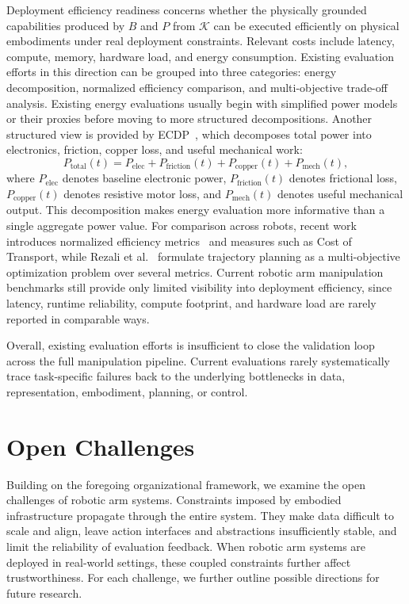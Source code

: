\documentclass[acmsmall,screen,review]{acmart}
\begin{document}
Deployment efficiency readiness concerns whether the physically grounded capabilities produced by \(B\) and \(P\) from \(\mathcal{K}\) can be executed efficiently on physical embodiments under real deployment constraints. Relevant costs include latency, compute, memory, hardware load, and energy consumption. Existing evaluation efforts in this direction can be grouped into three categories: energy decomposition, normalized efficiency comparison, and multi-objective trade-off analysis.
Existing energy evaluations usually begin with simplified power models or their proxies before moving to more structured decompositions.
Another structured view is provided by ECDP~\cite{heredia2023ecdp}, which decomposes total power into electronics, friction, copper loss, and useful mechanical work:
\begin{equation}
P_{\text{total}}(t) = P_{\text{elec}} + P_{\text{friction}}(t) + P_{\text{copper}}(t) + P_{\text{mech}}(t),
\end{equation}
where \(P_{\text{elec}}\) denotes baseline electronic power, \(P_{\text{friction}}(t)\) denotes frictional loss, \(P_{\text{copper}}(t)\) denotes resistive motor loss, and \(P_{\text{mech}}(t)\) denotes useful mechanical output.
This decomposition makes energy evaluation more informative than a single aggregate power value.
For comparison across robots, recent work introduces normalized efficiency metrics~\cite{vidussi2021energy,heredia2025evaluating} and measures such as Cost of Transport, 
while Rezali et al.~\cite{rezali2025lstm} formulate trajectory planning as a multi-objective optimization problem over several metrics. 
Current robotic arm manipulation benchmarks still provide only limited visibility into deployment efficiency, since latency, runtime reliability, compute footprint, and hardware load are rarely reported in comparable ways.

Overall, existing evaluation efforts is insufficient to close the validation loop across the full manipulation pipeline.
Current evaluations rarely systematically trace task-specific failures back to the underlying bottlenecks in data, representation, embodiment, planning, or control.

\section{Open Challenges}\label{sec:challenges}

Building on the foregoing organizational framework, we examine the open challenges of robotic arm systems.
Constraints imposed by embodied infrastructure propagate through the entire system.
They make data difficult to scale and align, leave action interfaces and abstractions insufficiently stable, and limit the reliability of evaluation feedback.
When robotic arm systems are deployed in real-world settings, these coupled constraints further affect trustworthiness.
For each challenge, we further outline possible directions for future research.
\end{document}
